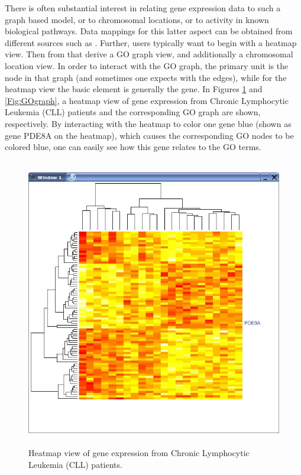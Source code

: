 \documentclass{article}[11pt]
\begin{document}
There is often substantial interest in relating gene expression data
to such a graph based model, or to chromosomal locations, or to
activity in known biological pathways. Data mappings for this latter
aspect can be obtained from different sources such as \cite{KEGG}.
Further, users typically want to begin with a heatmap view. Then from
that derive a GO graph view, and additionally a chromosomal location
view. In order to interact with the GO graph, the primary unit is the
node in that graph (and sometimes one expects with the edges), while
for the heatmap view the basic element is generally the gene.  In Figures
\ref{Fig:heatmap} and \ref{Fig:GOgraph}, a heatmap view of gene expression
from Chronic Lymphocytic Leukemia (CLL) patients and the corresponding GO
graph are shown, respectively.  By interacting with the heatmap to color one
gene blue (shown as gene PDE8A on the heatmap), which causes the corresponding
GO nodes to be colored blue, one can easily see how this gene relates to the
GO terms. 

\begin{figure}[ht]
  \begin{center}
    \includegraphics[height=5in, width=5in]{heatmap.jpg}
    \caption{ Heatmap view of gene expression from Chronic Lymphocytic
      Leukemia (CLL) patients. }
    \label{Fig:heatmap}
  \end{center}
\end{figure}
\end{document}
